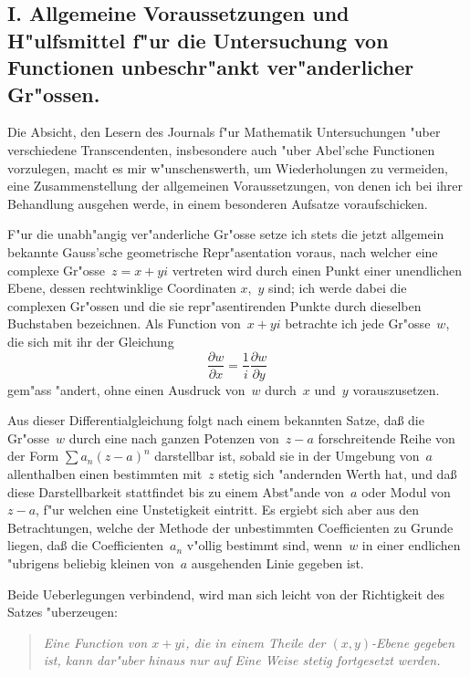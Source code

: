 \documentclass[12pt,a4paper]{article}
\begin{document}
\subsection*{I. Allgemeine Voraussetzungen und H"ulfsmittel f"ur die
Untersuchung von Functionen unbeschr"ankt ver"anderlicher Gr"ossen.}

Die Absicht, den Lesern des Journals f"ur Mathematik Untersuchungen
"uber verschiedene Transcendenten, insbesondere auch "uber Abel'sche
Functionen vorzulegen, macht es mir w"unschenswerth, um Wiederholungen
zu vermeiden, eine Zusammenstellung der allgemeinen Voraussetzungen,
von denen ich bei ihrer Behandlung ausgehen werde, in einem besonderen
Aufsatze voraufschicken.

F"ur die unabh"angig ver"anderliche Gr"osse setze ich stets die jetzt
allgemein bekannte Gauss'sche geometrische Repr"asentation voraus,
nach welcher eine complexe Gr"osse~$z = x + yi$ vertreten wird durch
einen Punkt einer unendlichen Ebene, dessen rechtwinklige Coordinaten
$x$,~$y$ sind; ich werde dabei die complexen Gr"ossen und die sie
repr"asentirenden Punkte durch dieselben Buchstaben bezeichnen. Als
Function von~$x + yi$ betrachte ich jede Gr"osse~$w$, die sich mit ihr
der Gleichung
\begin{equation}
\label{eq:diff}
\frac{\partial w}{\partial x} = \frac{1}{i}\frac{\partial w}{\partial y}
\end{equation}
gem"ass "andert, ohne einen Ausdruck von~$w$ durch~$x$ und~$y$
vorauszusetzen.

Aus dieser Differentialgleichung folgt nach einem bekannten Satze, da\ss{}
die Gr"osse~$w$ durch eine nach ganzen Potenzen von~$z - a$
forschreitende Reihe von der Form $\sum a_n(z-a)^n$ darstellbar ist,
sobald sie in der Umgebung von~$a$ allenthalben einen bestimmten
mit~$z$ stetig sich "andernden Werth hat, und da\ss{} diese Darstellbarkeit
stattfindet bis zu einem Abst"ande von~$a$ oder Modul von~$z - a$, f"ur
welchen eine Unstetigkeit eintritt. Es ergiebt sich aber aus den
Betrachtungen, welche der Methode der unbestimmten Coefficienten zu
Grunde liegen, da\ss{} die Coefficienten~$a_n$ v"ollig bestimmt sind, wenn~$w$
in einer endlichen "ubrigens beliebig kleinen von~$a$ ausgehenden Linie
gegeben ist.

Beide Ueberlegungen verbindend, wird man sich leicht von der Richtigkeit
des Satzes "uberzeugen:

\begin{quote}
\textit{Eine Function von $x + yi$, die in einem Theile der $(x,y)$-Ebene
gegeben ist, kann dar"uber hinaus nur auf \emph{Eine} Weise stetig
fortgesetzt werden.}
\end{quote}
\end{document}
